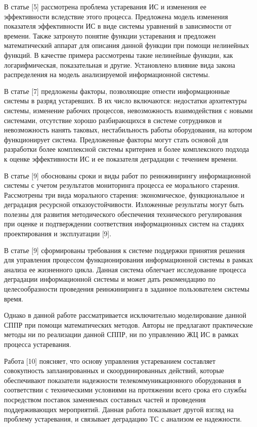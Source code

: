 В статье [5] рассмотрена проблема устаревания ИС и изменения ее эффективности вследствие этого процесса. 
Предложена модель изменения показателя эффективности ИС в виде системы уравнений в зависимости от времени. 
Также затронуто понятие функции устаревания и предложен математический аппарат для описания данной функции при помощи нелинейных функций. 
В качестве примера рассмотрены такие нелинейные функции, как логарифмическая, показательная и другие.
Установлено влияние вида закона распределения на модель анализируемой информационной системы.

В статье [7] предложены факторы, позволяющие отнести информационные системы в разряд устаревших. 
В их число включаются: недостатки архитектуры системы, изменение рабочих процессов, невозможность взаимодействия с новыми системами, отсутствие хорошо разбирающихся в системе сотрудников и невозможность нанять таковых, нестабильность работы оборудования, на котором функционирует система. 
Предложенные факторы могут стать основой для разработки более комплексной системы критериев и более комплексного подхода к оценке эффективности ИС и ее показателя деградации с течением времени.

В статье [9] обоснованы сроки и виды работ по реинжинирингу информационной системы с учетом результатов мониторинга процесса ее морального старения. 
Рассмотрены три вида морального старения: экономическое, функциональное и деградация ресурсной отказоустойчивости. 
Изложенные результаты могут быть полезны для развития методического обеспечения технического регулирования при оценке и подтверждении соответствия информационных систем на стадиях проектирования и эксплуатации [9].

В статье [9] сформированы требования к системе поддержки принятия решения для управления процессом функционирования информационной системы в рамках анализа ее жизненного цикла. 
Данная система облегчает исследование процесса деградации информационной системы и может дать рекомендацию по целесообразности проведения реинжиниринга в заданное пользователем системы время.

Однако в данной работе рассматривается исключительно моделирование данной СППР при помощи математических методов. 
Авторы не предлагают практические методы ни по реализации данной СППР, ни по управлению ЖЦ ИС в рамках процесса устаревания.

Работа [10] поясняет, что основу управления устареванием составляет совокупность запланированных и скоординированных действий, которые обеспечивают показатели надежности телекоммуникационного оборудования в соответствии с техническими условиями на протяжении всего срока его службы посредством поставок заменяемых составных частей и проведения поддерживающих мероприятий. 
Данная работа показывает другой взгляд на проблему устаревания, и связывает деградацию ТС с анализом ее надежности.

